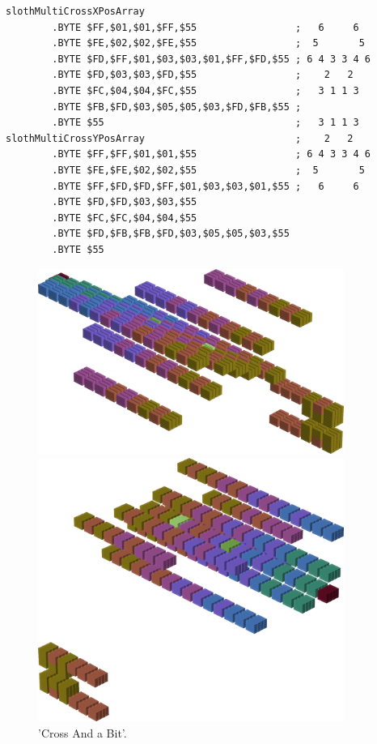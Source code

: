 \begin{lstlisting}
slothMultiCrossXPosArray
        .BYTE $FF,$01,$01,$FF,$55                 ;   6     6  
        .BYTE $FE,$02,$02,$FE,$55                 ;  5       5 
        .BYTE $FD,$FF,$01,$03,$03,$01,$FF,$FD,$55 ; 6 4 3 3 4 6
        .BYTE $FD,$03,$03,$FD,$55                 ;    2   2   
        .BYTE $FC,$04,$04,$FC,$55                 ;   3 1 1 3  
        .BYTE $FB,$FD,$03,$05,$05,$03,$FD,$FB,$55 ;            
        .BYTE $55                                 ;   3 1 1 3  
slothMultiCrossYPosArray                          ;    2   2   
        .BYTE $FF,$FF,$01,$01,$55                 ; 6 4 3 3 4 6
        .BYTE $FE,$FE,$02,$02,$55                 ;  5       5 
        .BYTE $FF,$FD,$FD,$FF,$01,$03,$03,$01,$55 ;   6     6  
        .BYTE $FD,$FD,$03,$03,$55
        .BYTE $FC,$FC,$04,$04,$55
        .BYTE $FD,$FB,$FB,$FD,$03,$05,$05,$03,$55
        .BYTE $55

\end{lstlisting}


\begin{figure}[H]
    \centering
    \begin{adjustbox}{width=10cm,center}
      \includegraphics[width=10cm]{src/colorspace_patterns/pattern6-45.png}%
    \end{adjustbox}
    \begin{adjustbox}{width=10cm}
      \includegraphics[width=10cm]{src/colorspace_patterns/pattern6-225.png}%
    \end{adjustbox}
\caption{'Cross And a Bit'.}
\end{figure}
\clearpage

